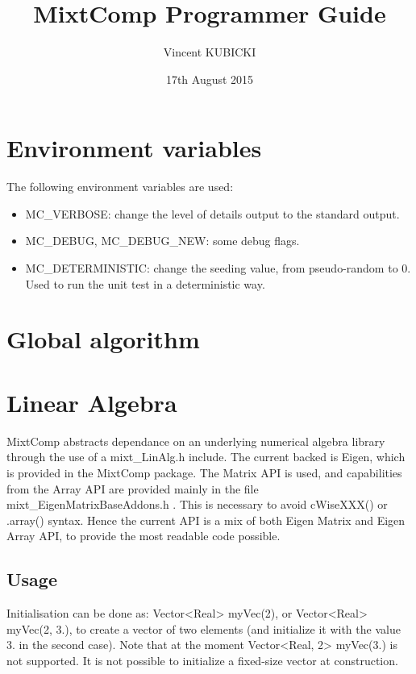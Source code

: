 \documentclass{article}
\title{MixtComp Programmer Guide}
\author{Vincent KUBICKI}
\date{17th August 2015}
\begin{document}
\maketitle

\section{Environment variables}

The following environment variables are used:

\begin{itemize}
	\item MC_VERBOSE: change the level of details output to the standard output.
	\item MC_DEBUG, MC_DEBUG_NEW:  some debug flags.
	\item MC_DETERMINISTIC: change the seeding value, from pseudo-random to 0. Used to run the unit test in a deterministic way.
\end{itemize}

\section{Global algorithm}

\section{Linear Algebra}

MixtComp abstracts dependance on an underlying numerical algebra library through the use of a mixt_LinAlg.h include. The current backed is Eigen, which is provided in the MixtComp package. The Matrix API is used, and capabilities from the Array API are provided mainly in the file mixt_EigenMatrixBaseAddons.h . This is necessary to avoid cWiseXXX() or .array() syntax. Hence the current API is a mix of both Eigen Matrix and Eigen Array API, to provide the most readable code possible.

\subsection{Usage}

Initialisation can be done as: Vector<Real> myVec(2), or Vector<Real> myVec(2, 3.), to create a vector of two elements (and initialize it with the value 3. in the second case). Note that at the moment Vector<Real, 2> myVec(3.) is not supported. It is not possible to initialize a fixed-size vector at construction.
\end{document}
